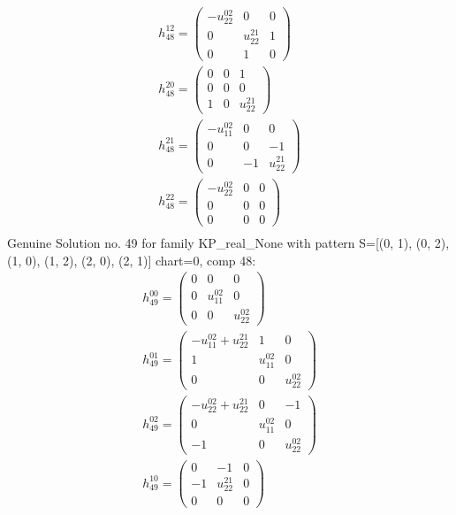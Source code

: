 \documentclass[a4paper, 11pt, twoside, onecolumn]{article}
\begin{document}
\begin{landscape}
\begin{gather*}
	 h_{48}^{12}=\begin{pmatrix}- u^{02}_{22} & 0 & 0\\0 & u^{21}_{22} & 1\\0 & 1 & 0\end{pmatrix}\\ 
	 h_{48}^{20}=\begin{pmatrix}0 & 0 & 1\\0 & 0 & 0\\1 & 0 & u^{21}_{22}\end{pmatrix}\\ 
	 h_{48}^{21}=\begin{pmatrix}- u^{02}_{11} & 0 & 0\\0 & 0 & -1\\0 & -1 & u^{21}_{22}\end{pmatrix}\\ 
	 h_{48}^{22}=\begin{pmatrix}- u^{02}_{22} & 0 & 0\\0 & 0 & 0\\0 & 0 & 0\end{pmatrix}\\ 
\end{gather*} 
Genuine Solution no. 49 for family KP_real_None with pattern S=[(0, 1), (0, 2), (1, 0), (1, 2), (2, 0), (2, 1)] chart=0, comp 48: 
\begin{gather*} 
	 h_{49}^{00}=\begin{pmatrix}0 & 0 & 0\\0 & u^{02}_{11} & 0\\0 & 0 & u^{02}_{22}\end{pmatrix}\\ 
	 h_{49}^{01}=\begin{pmatrix}- u^{02}_{11} + u^{21}_{22} & 1 & 0\\1 & u^{02}_{11} & 0\\0 & 0 & u^{02}_{22}\end{pmatrix}\\ 
	 h_{49}^{02}=\begin{pmatrix}- u^{02}_{22} + u^{21}_{22} & 0 & -1\\0 & u^{02}_{11} & 0\\-1 & 0 & u^{02}_{22}\end{pmatrix}\\ 
	 h_{49}^{10}=\begin{pmatrix}0 & -1 & 0\\-1 & u^{21}_{22} & 0\\0 & 0 & 0\end{pmatrix}\\ 

\end{gather*}
\end{landscape}
\end{document}
